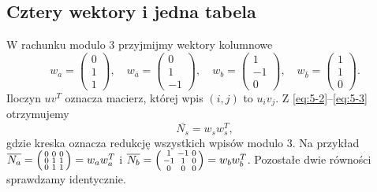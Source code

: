 \subsection{Cztery wektory i jedna tabela}
W rachunku modulo $3$ przyjmijmy wektory kolumnowe
\[
 w_a=\begin{pmatrix}0\\1\\1\end{pmatrix},\quad
 w_{\bar a}=\begin{pmatrix}0\\1\\-1\end{pmatrix},\quad
 w_b=\begin{pmatrix}1\\-1\\0\end{pmatrix},\quad
 w_{\bar b}=\begin{pmatrix}1\\1\\0\end{pmatrix}.
\]
Iloczyn $uv^T$ oznacza macierz, której wpis $(i,j)$ to $u_iv_j$. Z \eqref{eq:5-2}--\eqref{eq:5-3} otrzymujemy
\begin{equation}\label{eq:5-4}
 \overline{N_s}=w_sw_s^T,
\end{equation}
gdzie kreska oznacza redukcję wszystkich wpisów modulo $3$. Na przykład $\overline{N_a}=\begin{psmallmatrix}0&0&0\\0&1&1\\0&1&1\end{psmallmatrix}=w_aw_a^T$ i $\overline{N_b}=\begin{psmallmatrix}1&-1&0\\-1&1&0\\0&0&0\end{psmallmatrix}=w_bw_b^T$. Pozostałe dwie równości sprawdzamy identycznie.

